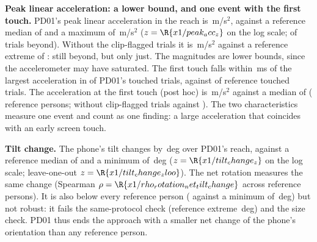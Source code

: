 \textbf{Peak linear acceleration: a lower bound, and one event with the first touch.}
PD01's peak linear acceleration in the reach is \,m/s$^2$, against a reference median of  and a maximum of \,m/s$^2$ ($z = \R{x1/peak_acc_z}$ on the log scale;  of  trials beyond).
Without the clip-flagged trials it is \,m/s$^2$ against a reference extreme of : still beyond, but only just.
The magnitudes are lower bounds, since the accelerometer may have saturated.
The first touch falls within \,ms of the largest acceleration in  of PD01's  touched trials, against  of  reference touched trials.
The acceleration at the first touch (post hoc) is \,m/s$^2$ against a median of  ( reference persons; without clip-flagged trials  against ).
The two characteristics measure one event and count as one finding: a large acceleration that coincides with an early screen touch.

\textbf{Tilt change.}
The phone's tilt changes by \,deg over PD01's reach, against a reference median of  and a minimum of \,deg ($z = \R{x1/tilt_change_z}$ on the log scale; leave-one-out $z = \R{x1/tilt_change_zloo}$).
The net rotation measures the same change (Spearman $\rho = \R{x1/rho_rotation_net_tilt_change}$ across reference persons).
It is also below every reference person ( against a minimum of \,deg) but not robust: it fails the same-protocol check (reference extreme \,deg) and the size check.
PD01 thus ends the approach with a smaller net change of the phone's orientation than any reference person.

